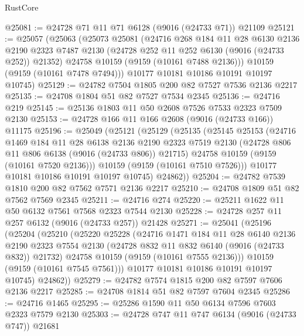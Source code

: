 \begin{lexlean}{RustCore}
\begin{coremodule}
@25081 := @24728 @71 @11 @71 @6128 (@9016 (@24733 @71)) @21109
@25121 := @25057
    (@25063
      (@25073
        @25081
        (@24716
          @268
          @184
          @11
          @28
          @6130
          @2136
          @2190
          @2323
          @7487
          @2130
          (@24728 @252 @11 @252 @6130 (@9016 (@24733 @252)) @21352)
          @24758
          @10159
          (@9159 (@10161 @7488 @2136)))
        @10159
        (@9159 (@10161 @7478 @7494)))
      @10177
      @10181
      @10186
      @10191
      @10197
      @10745)
@25129 := @24782 @7504 @1805 @200 @82 @7527 @7536 @2136 @2217
@25135 := @24708 @1804 @51 @82 @7527 @7534 @2345
@25136 := @24716 @219
@25145 := @25136 @1803 @11 @50 @2608 @7526 @7533 @2323 @7509 @2130
@25153 := @24728 @166 @11 @166 @2608 (@9016 (@24733 @166)) @11175
@25196 := @25049
    (@25121
      (@25129
        (@25135
          (@25145
            @25153
            (@24716
              @1469
              @184
              @11
              @28
              @6138
              @2136
              @2190
              @2323
              @7519
              @2130
              (@24728 @806 @11 @806 @6138 (@9016 (@24733 @806)) @21715)
              @24758
              @10159
              (@9159 (@10161 @7520 @2136)))
            @10159
            (@9159 (@10161 @7510 @7526)))
          @10177
          @10181
          @10186
          @10191
          @10197
          @10745)
        @24862))
@25204 := @24782 @7539 @1810 @200 @82 @7562 @7571 @2136 @2217
@25210 := @24708 @1809 @51 @82 @7562 @7569 @2345
@25211 := @24716 @274
@25220 := @25211 @1622 @11 @50 @6132 @7561 @7568 @2323 @7544 @2130
@25228 := @24728 @257 @11 @257 @6132 (@9016 (@24733 @257)) @21428
@25271 := @25041
    (@25196
      (@25204
        (@25210
          (@25220
            @25228
            (@24716
              @1471
              @184
              @11
              @28
              @6140
              @2136
              @2190
              @2323
              @7554
              @2130
              (@24728 @832 @11 @832 @6140 (@9016 (@24733 @832)) @21732)
              @24758
              @10159
              (@9159 (@10161 @7555 @2136)))
            @10159
            (@9159 (@10161 @7545 @7561)))
          @10177
          @10181
          @10186
          @10191
          @10197
          @10745)
        @24862))
@25279 := @24782 @7574 @1815 @200 @82 @7597 @7606 @2136 @2217
@25285 := @24708 @1814 @51 @82 @7597 @7604 @2345
@25286 := @24716 @1465
@25295 := @25286 @1590 @11 @50 @6134 @7596 @7603 @2323 @7579 @2130
@25303 := @24728 @747 @11 @747 @6134 (@9016 (@24733 @747)) @21681

\end{coremodule}
\end{lexlean}

